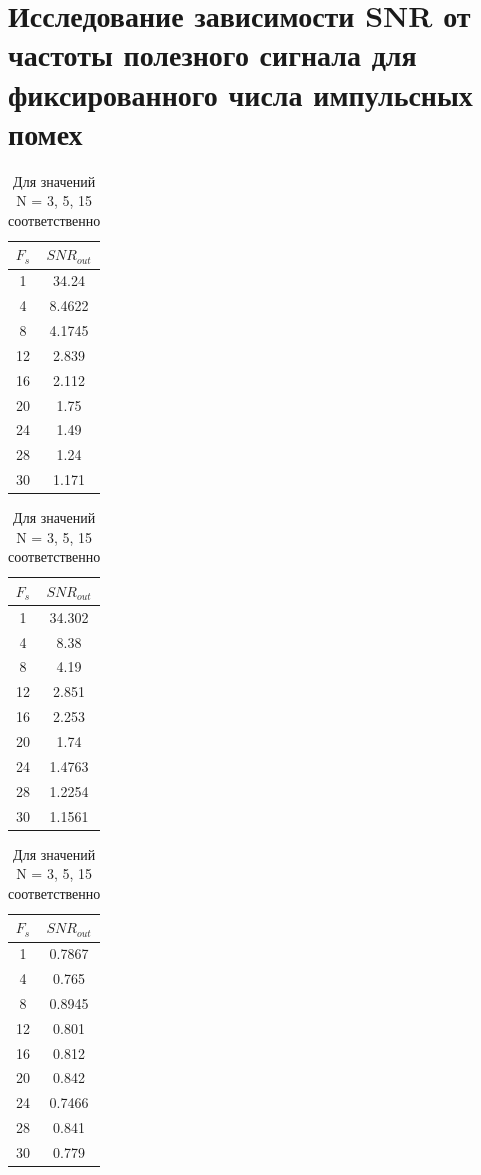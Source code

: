 \documentclass[12pt, a4paper] {ncc}
\begin{document}
\section*{Исследование зависимости SNR от частоты полезного сигнала для фиксированного числа импульсных помех}
        \begin{table}[H]
            \centering
            \begin{tabular} { |c|c| }
                \hline
					\textbf{$F_s$} & \textbf{$SNR_{out}$} \\ \hline
					1  &  34.24 \\ \hline
					4  &  8.4622 \\ \hline
					8  &  4.1745 \\ \hline
					12 &  2.839 \\ \hline
					16 &  2.112 \\ \hline
					20 &  1.75 \\ \hline
					24 &  1.49 \\ \hline
					28 &  1.24 \\ \hline
					30 &  1.171 \\ \hline
            \end{tabular}
            \begin{tabular} { |c|c| }
                \hline
					\textbf{$F_s$} & \textbf{$SNR_{out}$} \\ \hline
					1  &  34.302 \\ \hline
					4  &  8.38 \\ \hline
					8  &  4.19 \\ \hline
					12 &  2.851 \\ \hline
					16 &  2.253 \\ \hline
					20 &  1.74 \\ \hline
					24 &  1.4763 \\ \hline
					28 &  1.2254 \\ \hline
					30 &  1.1561 \\ \hline
            \end{tabular}
            \begin{tabular} { |c|c| }
                \hline
					\textbf{$F_s$} & \textbf{$SNR_{out}$} \\ \hline
					1  &  0.7867 \\ \hline
					4  &  0.765 \\ \hline
					8  &  0.8945 \\ \hline
					12 &  0.801 \\ \hline
					16 &  0.812 \\ \hline
					20 &  0.842 \\ \hline
					24 &  0.7466 \\ \hline
					28 &  0.841 \\ \hline
					30 &  0.779 \\ \hline
            \end{tabular}
			\caption{Для значений N = 3, 5, 15 соответственно}
        \end{table}
\end{document}
